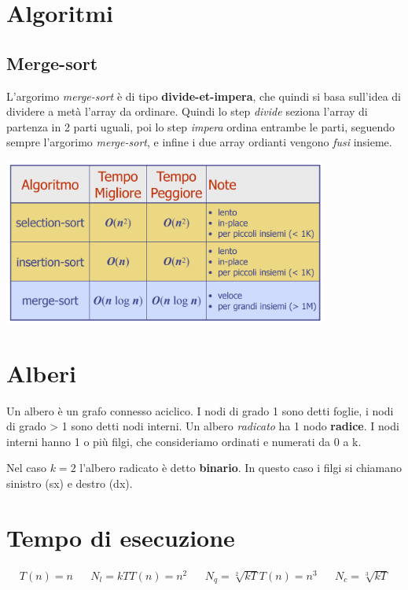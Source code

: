 \documentclass{article}
\begin{document}
\pagebreak

\section{Algoritmi}
\subsection{Merge-sort}
L'argorimo \emph{merge-sort} è di tipo \textbf{divide-et-impera}, che quindi si basa sull'idea di dividere a metà l'array da ordinare.
Quindi lo step \emph{divide} seziona l'array di partenza in 2 parti uguali, poi lo step \emph{impera} ordina entrambe le parti, seguendo sempre l'argorimo \emph{merge-sort}, e infine i due array ordianti vengono \emph{fusi} insieme.

\begin{center}
    \includegraphics[width=0.8\textwidth]{costo_algo.png}
\end{center}

\pagebreak

\section{Alberi}
Un albero è un grafo connesso aciclico. I nodi di grado 1 sono detti foglie, i nodi di grado > 1 sono detti nodi interni.
Un albero \emph{radicato} ha 1 nodo \textbf{radice}.
I nodi interni hanno 1 o più filgi, che consideriamo ordinati e numerati da 0 a k.

Nel caso \(k = 2\) l'albero radicato è detto \textbf{binario}. In questo caso i filgi si chiamano sinistro (sx) e destro (dx).

\pagebreak

\section{Tempo di esecuzione}
\begin{align*}
    T(n) = n   &  & N_l = kT
    T(n) = n^2 &  & N_q = \sqrt[2]{kT}
    T(n) = n^3 &  & N_c = \sqrt[3]{kT}
\end{align*}
\end{document}
